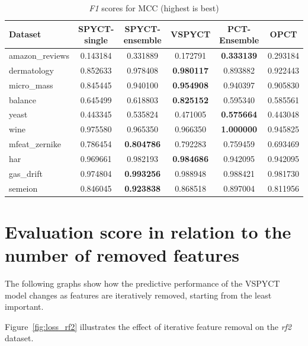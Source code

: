 \documentclass[3p,review,authoryear]{elsarticle}
\begin{document}
\begin{table}[h!]
\centering
\caption{\textit{F1} scores for MCC (highest is best)}
\label{tab:mcc_results}
\begin{tabular}{@{}lccccc@{}}
\toprule
Dataset & SPYCT-single & SPYCT-ensemble & VSPYCT & PCT-Ensemble & OPCT \\ \midrule
amazon\_reviews & 0.143184 & 0.331889 & 0.172791 & \textbf{0.333139} & 0.293184 \\
dermatology      & 0.852633 & 0.978408 & \textbf{0.980117} & 0.893882 & 0.922443 \\
micro\_mass      & 0.845445 & 0.940100 & \textbf{0.954908} & 0.940397 & 0.905830 \\
balance          & 0.645499 & 0.618803 & \textbf{0.825152} & 0.595340 & 0.585561 \\
yeast            & 0.443345 & 0.535824 & 0.471005 & \textbf{0.575664} & 0.443048 \\
wine             & 0.975580 & 0.965350 & 0.966350 & \textbf{1.000000} & 0.945825 \\
mfeat\_zernike   & 0.786454 & \textbf{0.804786} & 0.792283 & 0.759459 & 0.693469 \\
har              & 0.969661 & 0.982193 & \textbf{0.984686} & 0.942095 & 0.942095 \\
gas\_drift        & 0.974804 & \textbf{0.993256} & 0.988948 & 0.988421 & 0.981730 \\
semeion          & 0.846045 & \textbf{0.923838} & 0.868518 & 0.897004 & 0.811956 \\
\bottomrule
\end{tabular}
\end{table}

\clearpage
\section{Evaluation score in relation to the number of removed features}

The following graphs show how the predictive performance of the VSPYCT model changes as features are iteratively removed, starting from the least important.

Figure~\ref{fig:loss_rf2} illustrates the effect of iterative feature removal on the \textit{rf2} dataset.
\end{document}
